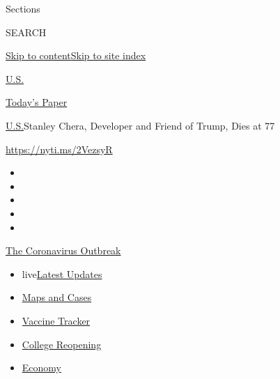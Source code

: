 Sections

SEARCH

\protect\hyperlink{site-content}{Skip to
content}\protect\hyperlink{site-index}{Skip to site index}

\href{https://www.nytimes3xbfgragh.onion/section/us}{U.S.}

\href{https://myaccount.nytimes3xbfgragh.onion/auth/login?response_type=cookie\&client_id=vi}{}

\href{https://www.nytimes3xbfgragh.onion/section/todayspaper}{Today's
Paper}

\href{/section/us}{U.S.}\textbar{}Stanley Chera, Developer and Friend of
Trump, Dies at 77

\url{https://nyti.ms/2VezsyR}

\begin{itemize}
\item
\item
\item
\item
\item
\end{itemize}

\href{https://www.nytimes3xbfgragh.onion/news-event/coronavirus?action=click\&pgtype=Article\&state=default\&region=TOP_BANNER\&context=storylines_menu}{The
Coronavirus Outbreak}

\begin{itemize}
\tightlist
\item
  live\href{https://www.nytimes3xbfgragh.onion/2020/08/04/world/coronavirus-covid-19.html?action=click\&pgtype=Article\&state=default\&region=TOP_BANNER\&context=storylines_menu}{Latest
  Updates}
\item
  \href{https://www.nytimes3xbfgragh.onion/interactive/2020/us/coronavirus-us-cases.html?action=click\&pgtype=Article\&state=default\&region=TOP_BANNER\&context=storylines_menu}{Maps
  and Cases}
\item
  \href{https://www.nytimes3xbfgragh.onion/interactive/2020/science/coronavirus-vaccine-tracker.html?action=click\&pgtype=Article\&state=default\&region=TOP_BANNER\&context=storylines_menu}{Vaccine
  Tracker}
\item
  \href{https://www.nytimes3xbfgragh.onion/2020/08/02/us/covid-college-reopening.html?action=click\&pgtype=Article\&state=default\&region=TOP_BANNER\&context=storylines_menu}{College
  Reopening}
\item
  \href{https://www.nytimes3xbfgragh.onion/live/2020/08/03/business/stock-market-today-coronavirus?action=click\&pgtype=Article\&state=default\&region=TOP_BANNER\&context=storylines_menu}{Economy}
\end{itemize}


